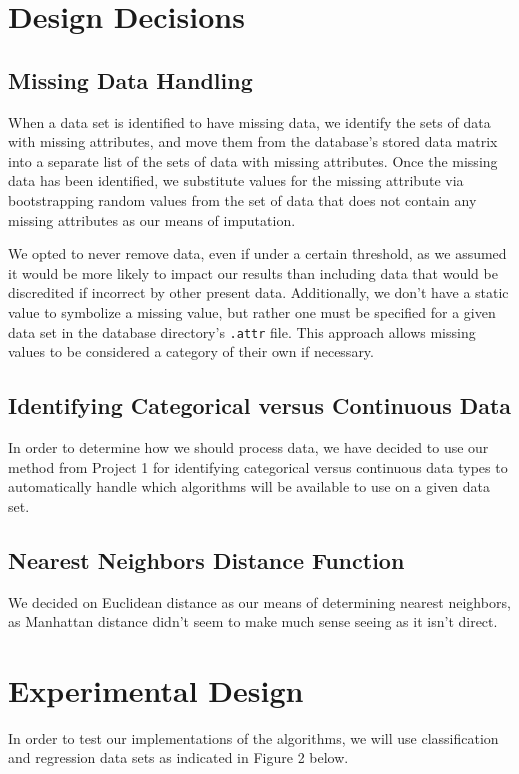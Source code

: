 \documentclass{article}
\begin{document}
\section{Design Decisions}

\subsection*{Missing Data Handling}
When a data set is identified to have missing data, we identify the sets of data with missing attributes, and move them from the database's stored data matrix into a separate list of the sets of data with missing attributes. Once the missing data has been identified, we substitute values for the missing attribute via bootstrapping random values from the set of data that does not contain any missing attributes as our means of imputation.

We opted to never remove data, even if under a certain threshold, as we assumed it would be more likely to impact our results than including data that would be discredited if incorrect by other present data. 
Additionally, we don't have a static value to symbolize a missing value, but rather one must be specified for a given data set in the database directory's \texttt{.attr} file. This approach allows missing values to be considered a category of their own if necessary.

\subsection*{Identifying Categorical versus Continuous Data}
In order to determine how we should process data, we have decided to use our method from Project 1 for identifying categorical versus continuous data types to automatically handle which algorithms will be available to use on a given data set.

\subsection*{Nearest Neighbors Distance Function}
We decided on Euclidean distance as our means of determining nearest neighbors, as Manhattan distance didn't seem to make much sense seeing as it isn't direct. 

\section{Experimental Design}

In order to test our implementations of the algorithms, we will use classification and regression data sets as indicated in Figure 2 below. 
\end{document}
